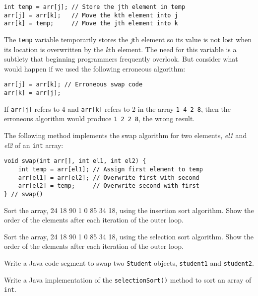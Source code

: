 \begin{jjjlisting}
\begin{lstlisting}
int temp = arr[j]; // Store the jth element in temp
arr[j] = arr[k];   // Move the kth element into j
arr[k] = temp;     // Move the jth element into k
\end{lstlisting}
\end{jjjlisting}

\noindent The {\tt temp} variable temporarily stores the {\em j}th
element so its value is not lost when its location is overwritten by
the {\em k}th element. The need for this variable is a subtlety that
beginning programmers frequently overlook. But consider what would
happen if we used the following erroneous algorithm:

\begin{jjjlisting}
\begin{lstlisting}
arr[j] = arr[k]; // Erroneous swap code
arr[k] = arr[j];
\end{lstlisting}
\end{jjjlisting}

\noindent If {\tt arr[j]} refers to 4 and {\tt arr[k]} refers to 2 in
the array \mbox{{\tt 1 4 2 8}}, then the erroneous algorithm would
produce \mbox{{\tt 1 2 2 8}}, the wrong result.  



\noindent The following method implements the swap algorithm for two
elements, {\it el1} and {\it el2} of an {\tt int} array:

\begin{jjjlisting}
\begin{lstlisting}
void swap(int arr[], int el1, int el2) {
    int temp = arr[el1]; // Assign first element to temp
    arr[el1] = arr[el2]; // Overwrite first with second
    arr[el2] = temp;     // Overwrite second with first
} // swap()
\end{lstlisting}
\end{jjjlisting}

\begin{SSTUDY}

\item Sort the array, 24 18 90 1 0 85 34 18, using the insertion sort
algorithm.  Show the order of the elements after each iteration of the
outer loop.

\item Sort the array, 24 18 90 1 0 85 34 18, using the selection sort
algorithm.  Show the order of the elements after each iteration of the
outer loop.

\item  Write a Java code segment to swap two {\tt Student} objects,
{\tt student1} and {\tt student2}.

\item Write a Java implementation of the {\tt selectionSort()} method to 
sort an array of {\tt int}.
\end{SSTUDY}

